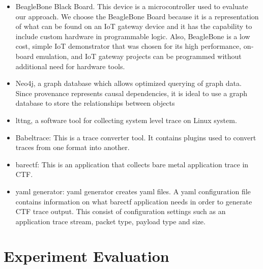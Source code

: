 \begin{itemize}
\item BeagleBone Black Board. This device is a microcontroller used to evaluate our approach. We choose the BeagleBone Board because it is a representation of what can be found on an IoT gateway device and it has the capability to include custom hardware in programmable logic. Also, BeagleBone is a low cost, simple IoT demonstrator that was chosen for its high performance, on­board emulation, and IoT gateway projects can be programmed without additional need for hardware tools.


\item Neo4j, a graph database which allows optimized querying of graph data. Since provenance represents causal dependencies, it is ideal to use a graph database to store the relationships between objects

\item lttng, a software tool for collecting system level trace on Linux system. 

\item Babeltrace:  This is a trace converter tool. It contains plugins used to convert traces from one format into another. 

\item barectf: This is an application that collects bare metal application trace in CTF.

\item yaml generator: yaml generator creates yaml files. A yaml configuration file contains information on what barectf application needs in order to generate CTF trace output. This consist of configuration settings such as an application trace stream, packet type, payload type and size. 


\end{itemize}




\section{Experiment Evaluation}


